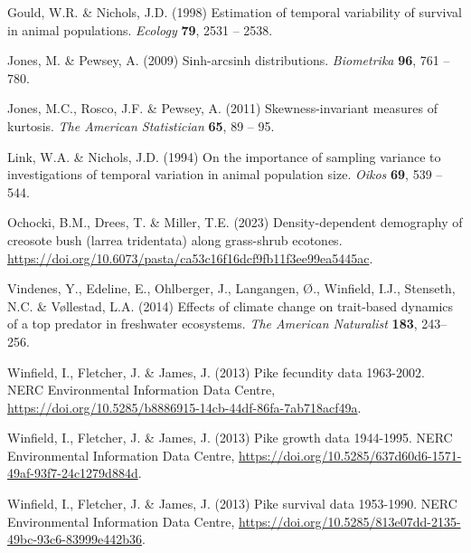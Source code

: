 \documentclass[12pt]{article}
\begin{document}
\begin{spacing}{1.35}
\begin{thebibliography}{62}
		Gould, W.R. \& Nichols, J.D. (1998) Estimation of temporal variability of
		survival in animal populations. \emph{Ecology} \textbf{79}, 2531 -- 2538.
		
		Jones, M. \& Pewsey, A. (2009) Sinh-arcsinh distributions. \emph{Biometrika}
		\textbf{96}, 761 -- 780.
		
		Jones, M.C., Rosco, J.F. \& Pewsey, A. (2011) Skewness-invariant measures of
		kurtosis. \emph{The American Statistician} \textbf{65}, 89 -- 95.
		
		Link, W.A. \& Nichols, J.D. (1994) On the importance of sampling variance to
		investigations of temporal variation in animal population size. \emph{Oikos}
		\textbf{69}, 539 -- 544.
		
		Ochocki, B.M., Drees, T. \& Miller, T.E. (2023) Density-dependent demography of
		creosote bush (larrea tridentata) along grass-shrub ecotones.
		\url{https://doi.org/10.6073/pasta/ca53c16f16dcf9fb11f3ee99ea5445ac}.
		
		Vindenes, Y., Edeline, E., Ohlberger, J., Langangen, {\O}., Winfield, I.J.,
		Stenseth, N.C. \& V{\o}llestad, L.A. (2014) Effects of climate change on
		trait-based dynamics of a top predator in freshwater ecosystems. \emph{The
			American Naturalist} \textbf{183}, 243--256.
		
		Winfield, I., Fletcher, J. \& James, J. (2013{}) Pike fecundity
		data 1963-2002. NERC Environmental Information Data Centre,
		\url{https://doi.org/10.5285/b8886915-14cb-44df-86fa-7ab718acf49a}.
		
		Winfield, I., Fletcher, J. \& James, J. (2013{}) Pike growth data
		1944-1995. NERC Environmental Information Data Centre, \url{
			https://doi.org/10.5285/637d60d6-1571-49af-93f7-24c1279d884d}.
		
		Winfield, I., Fletcher, J. \& James, J. (2013{}) Pike survival data
		1953-1990. NERC Environmental Information Data Centre,
		\url{https://doi.org/10.5285/813e07dd-2135-49bc-93c6-83999e442b36}.
		
	\end{thebibliography}

\end{spacing} 
\end{document}
